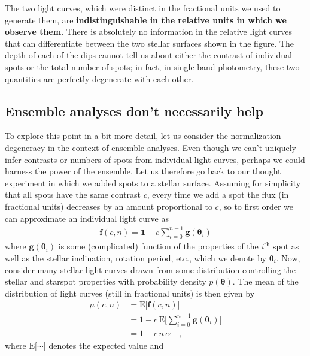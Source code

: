 \documentclass[modern]{aastex62}
\begin{document}
The two light curves, which were distinct in the fractional units we used
to generate them, are \textbf{indistinguishable in the relative units
    in which we observe them}. There is absolutely no information in the
relative light curves that can differentiate between the two stellar
surfaces shown in the figure. The depth of each of the dips cannot tell
us about either the contrast of individual spots or the total number of spots;
in fact, in single-band photometry, these two quantities are perfectly
degenerate with each other.

\subsection{Ensemble analyses don't necessarily help}
\label{sec:basic-gp}
%
To explore this point in a bit more detail, let us consider the normalization
degeneracy in the context of ensemble analyses. Even though we can't
uniquely infer contrasts or numbers of spots from individual light curves,
perhaps we could harness the power of the ensemble.
%
Let us therefore go
back to our thought experiment in which we added spots to a stellar
surface. Assuming for simplicity that all spots have the same contrast $c$,
every time we add a spot the flux (in fractional units)
decreases by an amount proportional to $c$, so to first order we can approximate an
individual light curve as
%
\begin{align}
    \label{eq:fapprox}
    \mathbf{f}(c, n) = \mathbf{1} - c \sum_{i=0}^{n-1} \mathbf{g}(\pmb{\theta}_i)
\end{align}
%
where $\mathbf{g}(\pmb{\theta}_i)$ is some (complicated) function of the properties
of the $i^\mathrm{th}$ spot
as well as the stellar inclination, rotation period, etc., which we
denote by $\pmb{\theta}_i$.
Now, consider many stellar light curves drawn from some distribution
controlling the stellar and starspot properties with probability density
$p(\pmb{\theta})$.
%
The mean of the distribution of
light curves (still in fractional units) is then given by
%
\begin{align}
    \mu(c, n) & = \mathrm{E} \Big[ \mathbf{f} (c, n) \Big] \nonumber                                      \\
              & = 1 - c \, \mathrm{E} \bigg[ \sum_{i=0}^{n-1} \mathbf{g}(\pmb{\theta}_i) \bigg] \nonumber \\
              & = 1 - c \, n \, \alpha
    \quad,
\end{align}
%
where $\mathrm{E}\big[\cdots\big]$ denotes the expected value and
\end{document}
